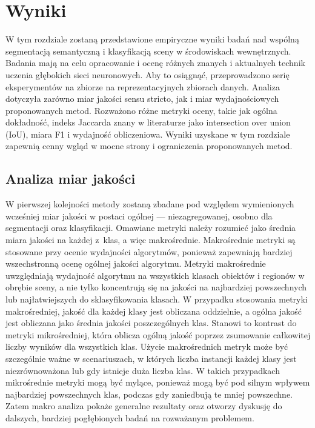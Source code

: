 \clearpage
\newpage %

\section{Wyniki}

W tym rozdziale zostaną przedstawione empiryczne wyniki badań nad wspólną segmentacją semantyczną i klasyfikacją sceny w środowiskach wewnętrznych. Badania mają na celu opracowanie i ocenę różnych znanych i aktualnych technik uczenia głębokich sieci neuronowych. Aby to osiągnąć, przeprowadzono serię eksperymentów na zbiorze na reprezentacyjnych zbiorach danych. Analiza dotyczyła zarówno miar jakości sensu stricto, jak i miar wydajnościowych proponowanych metod. Rozważono różne metryki oceny, takie jak ogólna dokładność, indeks Jaccarda znany w literaturze jako intersection over union (IoU), miara F1 i wydajność obliczeniowa. Wyniki uzyskane w tym rozdziale zapewnią cenny wgląd w mocne strony i ograniczenia proponowanych metod.

\subsection{Analiza miar jakości}
W pierwszej kolejności metody zostaną zbadane pod względem wymienionych wcześniej miar jakości w postaci ogólnej — niezagregowanej, osobno dla segmentacji oraz klasyfikacji. Omawiane metryki należy rozumieć jako średnia miara jakości na każdej z~klas, a więc makrośrednie. Makrośrednie metryki są stosowane przy ocenie wydajności algorytmów, ponieważ zapewniają bardziej wszechstronną ocenę ogólnej jakości algorytmu. Metryki makrośrednie uwzględniają wydajność algorytmu na wszystkich klasach obiektów i regionów w obrębie sceny, a nie tylko koncentrują się na jakości na najbardziej powszechnych lub najłatwiejszych do sklasyfikowania klasach. W przypadku stosowania metryki makrośredniej, jakość dla każdej klasy jest obliczana oddzielnie, a ogólna jakość jest obliczana jako średnia jakości poszczególnych klas. Stanowi to kontrast do metryki mikrośredniej, która oblicza ogólną jakość poprzez zsumowanie całkowitej liczby wyników dla wszystkich klas.
Użycie makrośrednich metryk może być szczególnie ważne w scenariuszach, w których liczba instancji każdej klasy jest niezrównoważona lub gdy istnieje duża liczba klas. W takich przypadkach mikrośrednie metryki mogą być mylące, ponieważ mogą być pod silnym wpływem najbardziej powszechnych klas, podczas gdy zaniedbują te mniej powszechne. Zatem makro analiza pokaże generalne rezultaty oraz otworzy dyskusję do dalszych, bardziej pogłębionych badań na rozważanym problemem.

